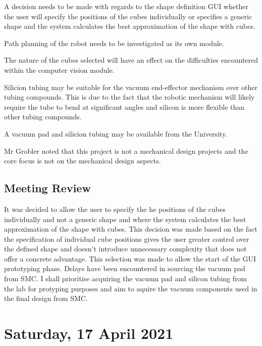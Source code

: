 \begin{compactitem}
    \item A decision needs to be made with regards to the shape definition GUI whether the user will specify the positions of the cubes individually or specifies a generic shape and the system calculates the best approximation of the shape with cubes.
    \item Path planning of the robot needs to be investigated as its own module.
    \item The nature of the cubes selected will have an effect on the difficulties encountered within the computer vision module.
    \item Silicion tubing may be suitable for the vacuum end-effector mechanism over other tubing compounds. This is due to the fact that the robotic mechanism will likely require the tube to bend at significant angles and silicon is more flexible than other tubing compounds.
    \item A vacuum pad and silicion tubing may be available from the University.
    \item Mr Grobler noted that this project is not a mechanical design projects and the core focus is not on the mechanical design aspects.
\end{compactitem}

\subsection{Meeting Review}

It was decided to allow the user to specify the he positions of the cubes individually and not a generic shape and where the system calculates the best approximation of the shape with cubes. This decision was made based on the fact the specification of individual cube positions gives the user greater control over the defined shape and doesn't introduce unnecessary complexity that does not offer a concrete advantage. This selection was made to allow the start of the GUI prototyping phase. Delays have been encountered in sourcing the vacuum pad from SMC. I shall prioritise acquiring the vacuum pad and silicon tubing from the lab for protyping purposes and aim to aquire the vacuum components used in the final design from SMC.

\pendsign

\section[2021/04/17]{Saturday, 17 April 2021}

